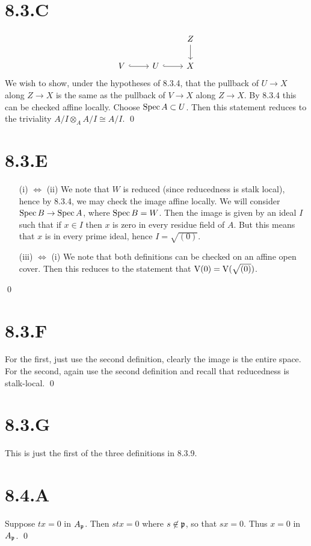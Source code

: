 \documentclass{article}
\begin{document}
\section{8.3.C}
\[\begin{tikzcd}
          &   & Z \\
        V & U & X
        \arrow[from=1-3, to=2-3]
        \arrow[hook, from=2-2, to=2-3]
        \arrow[hook, from=2-1, to=2-2]
    \end{tikzcd}\]
We wish to show, under the hypotheses of 8.3.4, that the pullback of
$U \to X$ along $Z\to X$ is the same as the
pullback of $V \to X$ along $Z \to X$. By 8.3.4
this can be checked affine locally. Choose $\operatorname{Spec} A \subset U$. Then this
statement reduces to the triviality $A/I \otimes_A A/I \cong A/I$. \qed

\section{8.3.E}
\begin{itemize}
    \item[(i) $\iff$ (ii)] We note that $W$ is
          reduced (since reducedness is stalk local), hence by 8.3.4, we may check the
          image affine locally. We will consider $\operatorname{Spec} B \to \operatorname{Spec} A$, where
          $\operatorname{Spec} B=W$. Then the image is given by an ideal
          $I$ such that if $x \in I$ then
          $x$ is zero in every residue field of
          $A$. But this means that $x$ is in every
          prime ideal, hence $I=\sqrt{(0)}$.
    \item[(iii) $\iff$ (i)] We note that both definitions can be checked
          on an affine open cover. Then this reduces to the statement that
          $\operatorname{V}(0)=\operatorname{V}(\sqrt{(0)})$.
\end{itemize}
\qed

\section{8.3.F}
For the first, just use the second definition, clearly the image is the entire
space. For the second, again use the second definition and recall that
reducedness is stalk-local. \qed

\section{8.3.G}
This is just the first of the three definitions in 8.3.9.

\section{8.4.A}
Suppose $tx=0$ in $A_{\mathfrak{p}}$. Then
$stx=0$ where $s \not \in \mathfrak{p}$, so that
$sx=0$. Thus $x=0$ in
$A_{\mathfrak{p}}$. \qed
\end{document}
